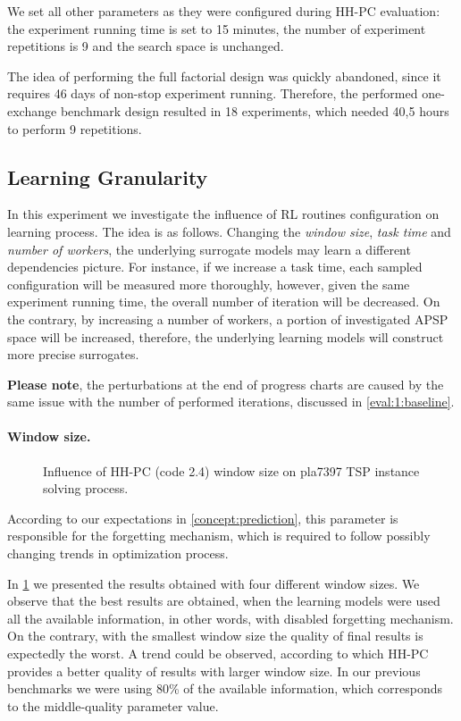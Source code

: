 We set all other parameters as they were configured during HH-PC evaluation: the experiment running time is set to 15 minutes, the number of experiment repetitions is 9 and the search space is unchanged.

The idea of performing the full factorial design was quickly abandoned, since it requires 46 days of non-stop experiment running.
Therefore, the performed one-exchange benchmark design resulted in 18 experiments, which needed 40,5 hours to perform 9 repetitions.

\subsection{Learning Granularity}\label{eval:2:learning granularity}
In this experiment we investigate the influence of RL routines configuration on learning process. The idea is as follows. Changing the \emph{window size}, \emph{task time} and \emph{number of workers}, the underlying surrogate models may learn a different dependencies picture. For instance, if we increase a task time, each sampled configuration will be measured more thoroughly, however, given the same experiment running time, the overall number of iteration will be decreased. On the contrary, by increasing a number of workers, a portion of investigated APSP space will be increased, therefore, the underlying learning models will construct more precise surrogates.

\textbf{Please note}, the perturbations at the end of progress charts are caused by the same issue with the number of performed iterations, discussed in \cref{eval:1:baseline}.

\paragraph{Window size.}
\begin{figure}[h]
	\centering
	\vspace{-20pt}
	
	\caption{Influence of HH-PC (code 2.4) window size on pla7397 TSP instance solving process.}
	\vspace{-5pt}
	\label{eval:2:pict:window size}
\end{figure}
According to our expectations in \cref{concept:prediction}, this parameter is responsible for the forgetting mechanism, which is required to follow possibly changing trends in optimization process.

In \cref{eval:2:pict:window size} we presented the results obtained with four different window sizes. We observe that the best results are obtained, when the learning models were used all the available information, in other words, with disabled forgetting mechanism. On the contrary, with the smallest window size the quality of final results is expectedly the worst. A trend could be observed, according to which HH-PC provides a better quality of results with larger window size. In our previous benchmarks we were using 80\% of the available information, which corresponds to the middle-quality parameter value.

